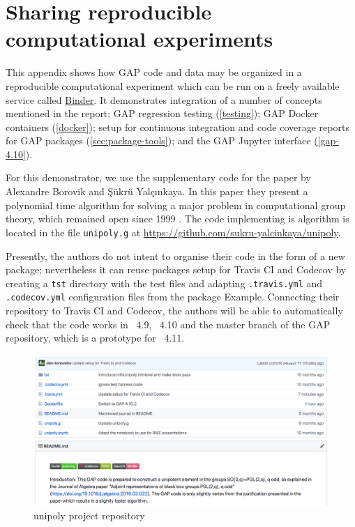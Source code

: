 \section{Sharing reproducible computational experiments}\label{sec:repro-gap}

This appendix shows how GAP code and data may be organized
in a reproducible computational experiment which can be run
on a freely available service called \href{https://mybinder.org/}{Binder}.
It demonstrates integration of a number of concepts mentioned
in the report: 
GAP regression testing (\ref{testing});
GAP Docker containers (\ref{docker});
setup for continuous integration and code coverage reports
for GAP packages (\ref{sec:package-tools}); 
and the GAP Jupyter interface (\ref{gap-4.10}).

For this demonstrator, we use the supplementary code for the 
paper \cite{black-box} by
Alexandre Borovik and \c{S}\"{u}kr\"{u} Yal\c{c}{\i}nkaya.
In this paper they present a polynomial time algorithm for 
solving a major problem in computational group theory, 
which remained open since 1999 \cite{babai-beals}. 
The code implementing is algorithm is located in the file
{\tt unipoly.g} at \url{https://github.com/sukru-yalcinkaya/unipoly}.

Presently, the authors do not intent to organise their code
in the form of a new \GAP package; nevertheless 
it can reuse packages setup for Travis CI and Codecov by 
creating a {\tt tst} directory with the test files and adapting
{\tt .travis.yml} and {\tt .codecov.yml} configuration files
from the \GAP package {\sf Example}. Connecting their repository
to Travis CI and Codecov, the authors will be able to automatically 
check that the code works in \GAP~4.9, \GAP~4.10 and 
the master branch of the GAP repository, which is a prototype for
\GAP~4.11.

\begin{figure}[!ht]
    \centering
    \includegraphics[width=\textwidth]{images/unipoly-repo}
    \caption{unipoly project repository}
    \label{fig:unipoly-repo}
\end{figure}

